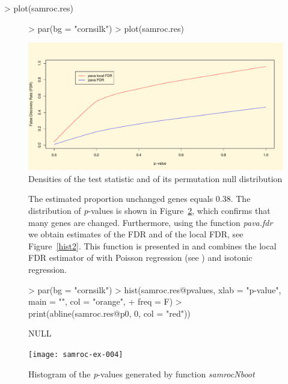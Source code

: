 \documentclass[11pt]{article}
\begin{document}
\begin{Schunk}
\begin{Sinput}
> plot(samroc.res)
\end{Sinput}
\end{Schunk}


\begin{figure}[htbp]
\centering

\begin{Schunk}
\begin{Sinput}
> par(bg = "cornsilk")
> plot(samroc.res)
\end{Sinput}
\end{Schunk}
\includegraphics{samroc-ex-003}
\caption{Densities of the test statistic and of its permutation null distribution}
\label{density}
\end{figure}

\begin{figure}[htbp]
\centering

The estimated proportion unchanged genes equals 0.38. The distribution of \textit{p}-values is shown in Figure~\ref{hist1},
which confirms that many genes are changed. Furthermore, using the function \textit{pava.fdr} we obtain estimates of the FDR and 
of the local FDR, see Figure~\ref{hist2}. This function is presented in \cite{broberg:2005} and combines the local FDR estimator 
of \cite{aubert:2004} with Poisson regression (see \cite{efron:2004}) and isotonic regression.

\begin{Schunk}
\begin{Sinput}
> par(bg = "cornsilk")
> hist(samroc.res@pvalues, xlab = "p-value", main = "", col = "orange", 
+     freq = F)
> print(abline(samroc.res@p0, 0, col = "red"))
\end{Sinput}
\begin{Soutput}
NULL
\end{Soutput}
\end{Schunk}
\texttt{[image: samroc-ex-004]}
\caption{Histogram of the \textit{p}-values generated by function \textit{samrocNboot}}
\label{hist1}
\end{figure}
\end{document}
